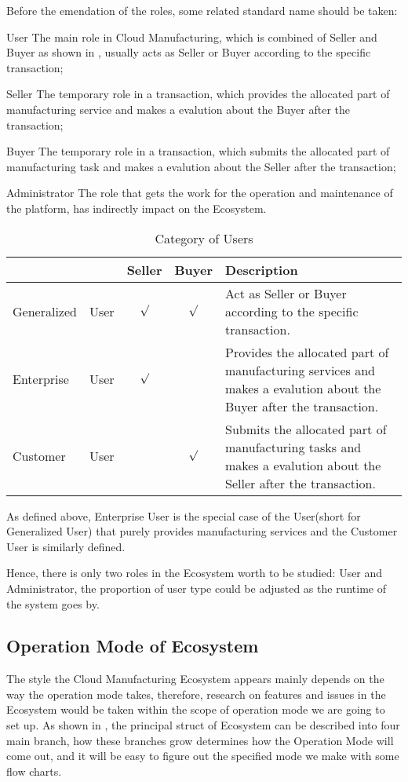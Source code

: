 Before the emendation of the roles, some related standard name should be taken:
\begin{asparadesc}
\item[User] The main role in Cloud Manufacturing, which is combined of Seller and Buyer as shown in , usually acts as Seller or Buyer according to the specific transaction;
\item[Seller] The temporary role in a transaction, which provides the allocated part of manufacturing service and makes a evalution about the Buyer after the transaction;
\item[Buyer] The temporary role in a transaction, which submits the allocated part of manufacturing task and makes a evalution about the Seller after the transaction;
\item[Administrator] The role that gets the work for the operation and maintenance of the platform, has indirectly impact on the Ecosystem.
\end{asparadesc}
\begin{table}[htbp]
  \centering\small
  \caption{Category of Users}
    \begin{tabularx}{\textwidth}{llccX}
    \toprule
        &  & Seller & Buyer & Description \\
    \midrule
    Generalized & User & $\surd$ & $\surd$ & Act as Seller or Buyer according to the specific transaction. \\
    Enterprise & User & $\surd$ & &  Provides the allocated part of manufacturing services and makes a evalution about the Buyer after the transaction. \\
    Customer & User& & $\surd$ &  Submits the allocated part of manufacturing tasks and makes a evalution about the Seller after the transaction.\\
    \bottomrule
    \end{tabularx}%
  \label{tab:categoryuser}%
\end{table}%
As defined above, Enterprise User is the special case of the User(short for Generalized User) that purely provides manufacturing services and the Customer User is similarly defined.

Hence, there is only two roles in the Ecosystem worth to be studied: User and Administrator, the proportion of user type could be adjusted as the runtime of the system goes by.

\subsection{Operation Mode of Ecosystem}
The style the Cloud Manufacturing Ecosystem appears mainly depends on the way the operation mode takes, therefore, research on features and issues in the Ecosystem would be taken within the scope of operation mode we are going to set up. As shown in , the principal struct of Ecosystem can be described into four main branch, how these branches grow determines how the Operation Mode will come out, and it will be easy to figure out the specified mode we make with some flow charts.

